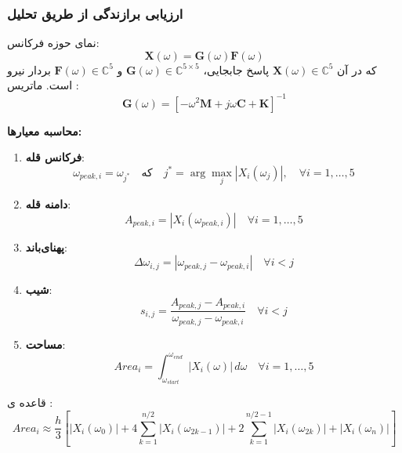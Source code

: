\subsubsection{ارزیابی برازندگی از طریق تحلیل }
نمای حوزه فرکانس:
\begin{equation}\label{Eq.frequency_domain_system_detailed}
\mathbf{X}(\omega) = \mathbf{G}(\omega) \mathbf{F}(\omega)
\end{equation}
که در آن $\mathbf{X}(\omega)\in\mathbb{C}^{5}$ پاسخ جابجایی، $\mathbf{G}(\omega)\in\mathbb{C}^{5\times 5}$  و $\mathbf{F}(\omega)\in\mathbb{C}^{5}$ بردار نیرو است. ماتریس :
\begin{equation}\label{Eq.frf_matrix_detailed}
\mathbf{G}(\omega) = \left[ -\omega^2 \mathbf{M} + j\omega \mathbf{C} + \mathbf{K} \right]^{-1}
\end{equation}

\textbf{محاسبه معیارها:}
\begin{enumerate}
    \item \textbf{فرکانس قله}:
    \begin{equation}\label{Eq.peak_frequency_analysis_detailed}
    \omega_{peak,i} = \omega_{j^*} \quad \text{که} \quad j^* = \arg\max_{j} |X_i(\omega_j)|, \quad \forall i = 1,\ldots,5
    \end{equation}
    \item \textbf{دامنه قله}:
    \begin{equation}\label{Eq.peak_amplitude_analysis_detailed}
    A_{peak,i} = |X_i(\omega_{peak,i})| \quad \forall i = 1,\ldots,5
    \end{equation}
    \item \textbf{پهنای‌باند}:
    \begin{equation}\label{Eq.bandwidth_analysis_detailed}
    \Delta\omega_{i,j} = |\omega_{peak,j} - \omega_{peak,i}| \quad \forall i < j
    \end{equation}
    \item \textbf{شیب}:
    \begin{equation}\label{Eq.slope_analysis_detailed}
    s_{i,j} = \frac{A_{peak,j} - A_{peak,i}}{\omega_{peak,j} - \omega_{peak,i}} \quad \forall i < j
    \end{equation}
    \item \textbf{مساحت}:
    \begin{equation}\label{Eq.area_analysis_detailed}
    Area_i = \int_{\omega_{start}}^{\omega_{end}} |X_i(\omega)| \, d\omega \quad \forall i = 1,\ldots,5
    \end{equation}
\end{enumerate}
قاعده ی :
\begin{equation}\label{Eq.area_simpson_detailed}
Area_i \approx \frac{h}{3} \left[|X_i(\omega_0)| + 4\sum_{k=1}^{n/2} |X_i(\omega_{2k-1})| + 2\sum_{k=1}^{n/2-1} |X_i(\omega_{2k})| + |X_i(\omega_n)| \right]
\end{equation}

